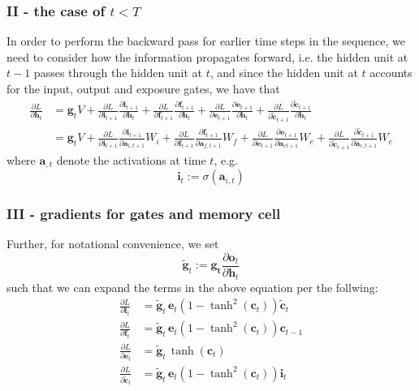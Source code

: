 \documentclass{article}
\begin{document}
\subsubsection*{II - the case of $t < T$}
	In order to perform the backward pass for earlier time steps in the sequence, we need to consider how the information propagates forward, i.e. the hidden unit at $t-1$ passes through the hidden unit at $t$, and since the hidden unit at $t$ accounts for the input, output and exposure gates, we have that
	\begin{align*}
		\frac{\partial L}{\partial \bm{h}_t} &= \bm{g}_t V + \frac{\partial L}{\partial \bm{i}_{t+1}}\frac{\partial \bm{i}_{t+1}}{\partial \bm{h}_t} + \frac{\partial L}{\partial \bm{f}_{t+1}}\frac{\partial \bm{f}_{t+1}}{\partial \bm{h}_t}  + \frac{\partial L}{\partial \bm{e}_{t+1}}\frac{\partial \bm{e}_{t+1}}{\partial \bm{h}_t} + \frac{\partial L}{\partial \tilde{\bm{c}}_{t+1}}\frac{\partial \tilde{\bm{c}}_{t+1}}{\partial \bm{h}_t}\\
		&= \bm{g}_t V  + \frac{\partial L}{\partial \bm{i}_{t+1}} \frac{\partial \bm{i}_{t+1}}{\partial \bm{a}_{i, t+1}} W_i + \frac{\partial L}{\partial \bm{f}_{t+1}}  \frac{\partial \bm{f}_{t+1}}{\partial \bm{a}_{f, t+1}}W_f  + \frac{\partial L}{\partial \bm{e}_{t+1}}  \frac{\partial \bm{e}_{t+1}}{\partial \bm{a}_{e t+1}}W_e + \frac{\partial L}{\partial \tilde{\bm{c}}_{t+1}}  \frac{\partial \tilde{\bm{c}}_{t+1}}{\partial \bm{a}_{c, t+1}}W_c
	\end{align*}
	where $\bm{a}_{, t}$ denote the activations at time $t$, e.g.
	$$\bm{i}_t := \sigma(\bm{a}_{i, t})$$ 

\subsubsection*{III - gradients for gates and memory cell}
	Further, for notational convenience, we set 
	$$ \tilde{\bm{g}}_t := \bm{g_t} \frac{\partial \bm{o}_t}{\partial \bm{h}_t}$$
	such that we can expand the terms in the above equation per the follwing:
	\begin{align*}
		\frac{\partial L}{\partial \bm{i}_{t}} &= \tilde{\bm{g}}_t\,\bm{e}_t (1 - \tanh^2(\bm{c}_t)) \tilde{\bm{c}}_t\\ %
		\frac{\partial L}{\partial \bm{f}_{t}} &= \tilde{\bm{g}}_t\,\bm{e}_t (1 - \tanh^2(\bm{c}_t)) \bm{c}_{t-1}\\ %
		\frac{\partial L}{\partial \bm{e}_{t}} &=\tilde{\bm{g}}_t\,  \tanh(\bm{c}_t)\\ %
		\frac{\partial L}{\partial \tilde{\bm{c}}_{t}} &= \tilde{\bm{g}}_t\, \bm{e}_t (1 - \tanh^2(\bm{c}_t)) \bm{i}_t %
	\end{align*}
\end{document}
